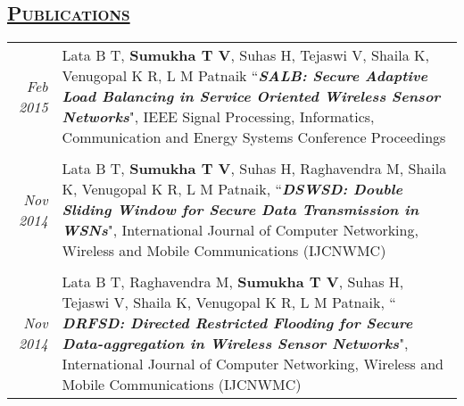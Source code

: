 \documentclass[14pt]{article}
\begin{document}
\subsection* {\scshape\LARGE\uline {Publications}}
\begin{tabularx}{\textwidth}{r X}
\emph{Feb 2015} & Lata B T, \textbf{Sumukha T V}, Suhas H, Tejaswi V, Shaila K, Venugopal K R, L M Patnaik ``\textbf{\textit{SALB: Secure Adaptive Load 		         Balancing in Service Oriented Wireless Sensor Networks}}",  IEEE Signal Processing, Informatics, Communication and Energy Systems Conference Proceedings \\ \\
\emph{Nov 2014} & Lata B T, \textbf{Sumukha T V}, Suhas H, Raghavendra M, Shaila K, Venugopal K R, L M Patnaik, ``\textbf{\textit{DSWSD: Double Sliding Window for Secure Data Transmission in WSNs}}", International Journal of Computer Networking, Wireless and Mobile Communications (IJCNWMC) \\ \\
\emph{Nov 2014} & Lata B T, Raghavendra M,  \textbf{Sumukha T V}, Suhas H, Tejaswi V, Shaila K, Venugopal K R, L M Patnaik, `` \textbf{\textit{DRFSD: Directed Restricted Flooding for Secure Data-aggregation in Wireless Sensor Networks}}", International Journal of Computer Networking, Wireless and Mobile Communications (IJCNWMC)
\end{tabularx}
\end{document}
